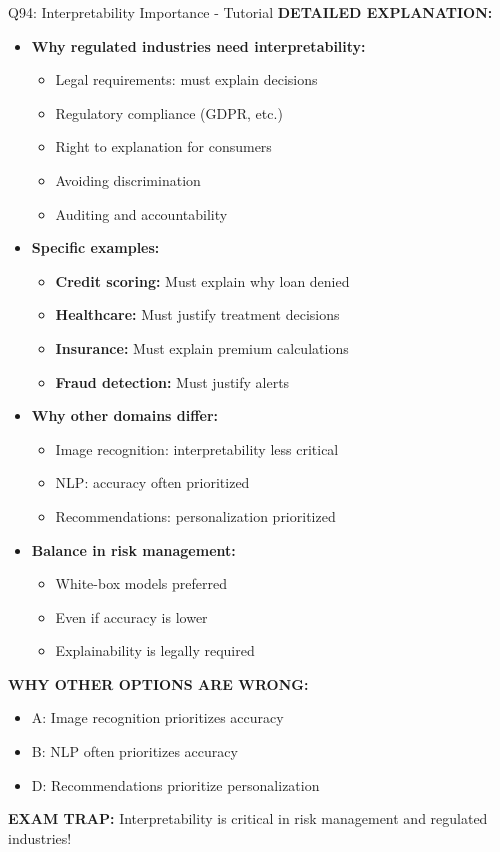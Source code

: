 \documentclass[8pt]{beamer}
\begin{document}
\begin{frame}{Q94: Interpretability Importance - Tutorial}
		\vspace{0.05cm}
		\textbf{DETAILED EXPLANATION:}
		\begin{itemize}
			\item \textbf{Why regulated industries need interpretability:}
			\begin{itemize}
				\item Legal requirements: must explain decisions
				\item Regulatory compliance (GDPR, etc.)
				\item Right to explanation for consumers
				\item Avoiding discrimination
				\item Auditing and accountability
			\end{itemize}
			\item \textbf{Specific examples:}
			\begin{itemize}
				\item \textbf{Credit scoring:} Must explain why loan denied
				\item \textbf{Healthcare:} Must justify treatment decisions
				\item \textbf{Insurance:} Must explain premium calculations
				\item \textbf{Fraud detection:} Must justify alerts
			\end{itemize}
			\item \textbf{Why other domains differ:}
			\begin{itemize}
				\item Image recognition: interpretability less critical
				\item NLP: accuracy often prioritized
				\item Recommendations: personalization prioritized
			\end{itemize}
			\item \textbf{Balance in risk management:}
			\begin{itemize}
				\item White-box models preferred
				\item Even if accuracy is lower
				\item Explainability is legally required
			\end{itemize}
		\end{itemize}
		
		\vspace{0.05cm}
		\textcolor{myred}{\textbf{WHY OTHER OPTIONS ARE WRONG:}}
		\begin{itemize}
			\item \textcolor{myred}{A:} Image recognition prioritizes accuracy
			\item \textcolor{myred}{B:} NLP often prioritizes accuracy
			\item \textcolor{myred}{D:} Recommendations prioritize personalization
		\end{itemize}
		
		\textcolor{myred}{\textbf{EXAM TRAP:}} Interpretability is critical in risk management and regulated industries!
	\end{frame}
	
\end{document}
